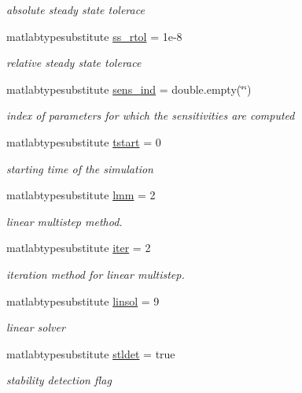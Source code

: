\begin{DoxyCompactItemize}
\begin{DoxyCompactList}\small\item\em absolute steady state tolerace \end{DoxyCompactList}\item 
matlabtypesubstitute \mbox{\hyperlink{classamioption_acc9c287f21293ab04c4303d90e7a6e98}{ss\+\_\+rtol}} = 1e-\/8
\begin{DoxyCompactList}\small\item\em relative steady state tolerace \end{DoxyCompactList}\item 
matlabtypesubstitute \mbox{\hyperlink{classamioption_a0505783cf66f362672cbe3320d47a94d}{sens\+\_\+ind}} = double.\+empty(\char`\"{}\char`\"{})
\begin{DoxyCompactList}\small\item\em index of parameters for which the sensitivities are computed \end{DoxyCompactList}\item 
matlabtypesubstitute \mbox{\hyperlink{classamioption_a18a69d8713604897ca9ee705d9d4fc4a}{tstart}} = 0
\begin{DoxyCompactList}\small\item\em starting time of the simulation \end{DoxyCompactList}\item 
matlabtypesubstitute \mbox{\hyperlink{classamioption_a6f4b21b13e0c8c531c452c70b43fc96a}{lmm}} = 2
\begin{DoxyCompactList}\small\item\em linear multistep method. \end{DoxyCompactList}\item 
matlabtypesubstitute \mbox{\hyperlink{classamioption_a1fc3ae6bd5c6a80e9b81b27fc7b7a11a}{iter}} = 2
\begin{DoxyCompactList}\small\item\em iteration method for linear multistep. \end{DoxyCompactList}\item 
matlabtypesubstitute \mbox{\hyperlink{classamioption_a06749b49eaa313f4d00f0115d3a7a7f3}{linsol}} = 9
\begin{DoxyCompactList}\small\item\em linear solver \end{DoxyCompactList}\item 
matlabtypesubstitute \mbox{\hyperlink{classamioption_a202e02f7d8c1a87b1c675bcc1acf1c8e}{stldet}} = true
\begin{DoxyCompactList}\small\item\em stability detection flag \end{DoxyCompactList}\item 

\end{DoxyCompactItemize}
